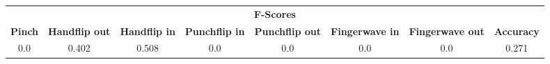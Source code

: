 \documentclass{standalone}
\begin{document}
 
 \begin{tabular}{|c|c|c|c|c|c|c ||c|}
\cline{1-8}\multicolumn{8}{|c|}{\textbf{F-Scores}} \\ 
\cline{1-8}\textbf{Pinch} & \textbf{Handflip out} & \textbf{Handflip in} & \textbf{Punchflip in} & \textbf{Punchflip out} & \textbf{Fingerwave in} & \textbf{Fingerwave out} & \textbf{Accuracy}\\ 
\cline{1-8}0.0 & 0.402 & 0.508 & 0.0 & 0.0 & 0.0 & 0.0 & 0.271\\ 
 \cline{1-8}\hline \end{tabular}
 
\end{document}
